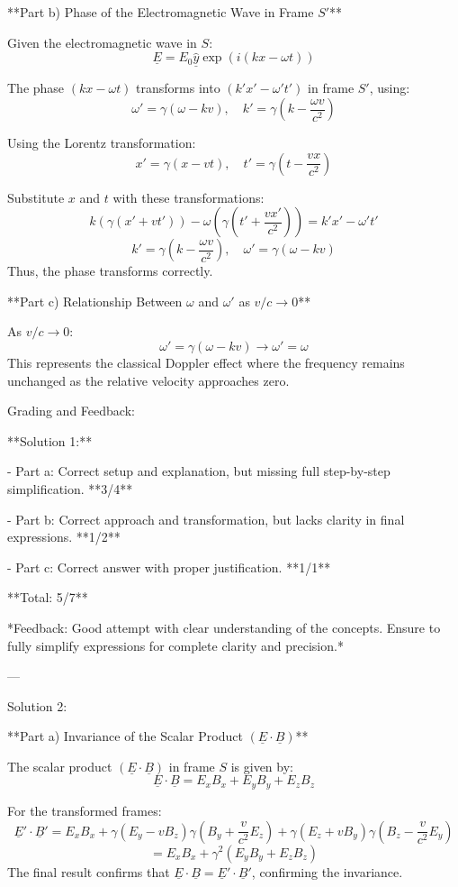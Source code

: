 \documentclass[a4paper,11pt]{article}
\begin{document}
**Part b) Phase of the Electromagnetic Wave in Frame \( S' \)**

Given the electromagnetic wave in \( S \):
\[ \underline{E} = E_{0} \hat{\underline{y}} \exp(i(kx - \omega t)) \]

The phase \( (kx - \omega t) \) transforms into \( (k'x' - \omega' t') \) in frame \( S' \), using:
\[ \omega' = \gamma(\omega - kv), \quad k' = \gamma(k - \frac{\omega v}{c^{2}}) \]

Using the Lorentz transformation:
\[
x' = \gamma(x - vt), \quad t' = \gamma(t - \frac{vx}{c^{2}})
\]

Substitute \( x \) and \( t \) with these transformations:
\[
k (\gamma (x' + vt')) - \omega (\gamma (t' + \frac{vx'}{c^2})) = k' x' - \omega' t'
\]
\[
k' = \gamma (k - \frac{\omega v}{c^2}), \quad \omega' = \gamma (\omega - kv)
\]
Thus, the phase transforms correctly.

**Part c) Relationship Between \( \omega \) and \( \omega' \) as \( v/c \rightarrow 0 \)**

As \( v/c \rightarrow 0 \):
\[
\omega' = \gamma(\omega - kv) \rightarrow \omega' = \omega
\]
This represents the classical Doppler effect where the frequency remains unchanged as the relative velocity approaches zero.

Grading and Feedback:

**Solution 1:**

- Part a: Correct setup and explanation, but missing full step-by-step simplification. **3/4**

- Part b: Correct approach and transformation, but lacks clarity in final expressions. **1/2**

- Part c: Correct answer with proper justification. **1/1**

**Total: 5/7**

*Feedback: Good attempt with clear understanding of the concepts. Ensure to fully simplify expressions for complete clarity and precision.*

---

Solution 2:

**Part a) Invariance of the Scalar Product \( (\underline{E} \cdot \underline{B}) \)**

The scalar product \( (\underline{E} \cdot \underline{B}) \) in frame \( S \) is given by:
\[
\underline{E} \cdot \underline{B} = E_{x}B_{x} + E_{y}B_{y} + E_{z}B_{z}
\]

For the transformed frames:
\[
\underline{E}' \cdot \underline{B}' = E_{x}B_{x} + \gamma(E_{y} - vB_{z})\gamma(B_{y} + \frac{v}{c^{2}}E_{z}) + \gamma(E_{z} + vB_{y})\gamma(B_{z} - \frac{v}{c^{2}}E_{y})
\]
\[
= E_x B_x + \gamma^2 (E_y B_y + E_z B_z)
\]
The final result confirms that \(\underline{E} \cdot \underline{B} = \underline{E}' \cdot \underline{B}'\), confirming the invariance.
\end{document}
